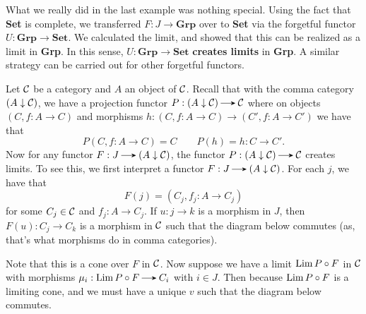     What we really did in the last example was nothing special. Using the fact that 
    \textbf{Set} is complete, we transferred $F: J \to \textbf{Grp}$
    over to \textbf{Set} via the forgetful functor $U: \textbf{Grp} 
    \to \textbf{Set}$. We calculated the limit, and showed that this can
    be realized as a limit in \textbf{Grp}. In this sense, $U: \textbf{Grp} \to 
    \textbf{Set}$ \textbf{creates limits} in \textbf{Grp}. A similar
    strategy can be carried out for other forgetful functors. 

    \begin{example}
        Let $\cc$ be a category and $A$ an object of $\cc$. Recall that 
        with the comma category $(A \downarrow \cc)$, we have a projection 
        functor $P: (A \downarrow \cc) \to \cc$ where on objects 
        $(C, f: A \to C)$ and morphisms $h: (C, f: A \to C) \to (C', f: A \to C')$ 
        we have that 
        \[
            P(C, f: A \to C) = C \qquad P(h) = h: C \to C'.            
        \]
        Now for any functor $F:J \to (A \downarrow \cc)$, the functor 
        $P: (A \downarrow \cc) \to \cc$ creates limits. To see this, we first interpret 
        a functor $F: J \to (A \downarrow \cc)$. For each $j$, we have that  
        \[
            F(j) = (C_j , f_j: A \to C_j) 
        \]
        for some $C_j \in \cc$ and $f_j: A \to C_j$. If $u: j \to k$ is a morphism in
        $J$, then $F(u) : C_j \to C_k$ is a morphism in $\cc$ 
        such that the diagram below commutes (as, that's what morphisms  
        do in comma categories). 
        \begin{center}
        \end{center}
        Note that this is a cone over $F$ in $\cc$. 
        Now suppose we have a limit $\Lim P \circ F$ in $\cc$ with 
        morphisms $\mu_i: \Lim P \circ F \to C_i$ with $i \in J$. 
        Then because $\Lim P \circ F$ is a limiting cone, and we must 
        have a unique $v$ such that the diagram below commutes. 
        \begin{center}
            \begin{tikzcd}[column sep = 1.4cm, row sep = 1.4cm]

\end{tikzcd}
\end{center}
\end{example}
